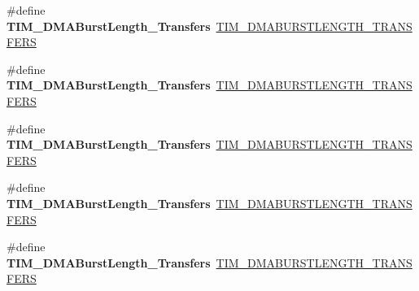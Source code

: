 \begin{DoxyCompactItemize}
\item 
\mbox{\label{group___h_a_l___t_i_m___aliased___defines_ga2fc09f2148cf6ebddc8e67116212259c}} 
\#define {\bfseries T\+I\+M\+\_\+\+D\+M\+A\+Burst\+Length\+\_\+Transfers}~\hyperlink{group___t_i_m___d_m_a___burst___length_ga793a89bb8a0669e274de451985186c53}{T\+I\+M\+\_\+\+D\+M\+A\+B\+U\+R\+S\+T\+L\+E\+N\+G\+T\+H\+\_\+T\+R\+A\+N\+S\+F\+E\+RS}
\item 
\mbox{\label{group___h_a_l___t_i_m___aliased___defines_ga0ca63a3caeaf1e85bd54961891949de7}} 
\#define {\bfseries T\+I\+M\+\_\+\+D\+M\+A\+Burst\+Length\+\_\+Transfers}~\hyperlink{group___t_i_m___d_m_a___burst___length_ga79ab58b6a3b30c54c0758b381df22cb0}{T\+I\+M\+\_\+\+D\+M\+A\+B\+U\+R\+S\+T\+L\+E\+N\+G\+T\+H\+\_\+T\+R\+A\+N\+S\+F\+E\+RS}
\item 
\mbox{\label{group___h_a_l___t_i_m___aliased___defines_ga9160d52913bbd7ad1e663ff943d01852}} 
\#define {\bfseries T\+I\+M\+\_\+\+D\+M\+A\+Burst\+Length\+\_\+Transfers}~\hyperlink{group___t_i_m___d_m_a___burst___length_gaf52962b501b3a76d89df6274ed425947}{T\+I\+M\+\_\+\+D\+M\+A\+B\+U\+R\+S\+T\+L\+E\+N\+G\+T\+H\+\_\+T\+R\+A\+N\+S\+F\+E\+RS}
\item 
\mbox{\label{group___h_a_l___t_i_m___aliased___defines_ga11485e9eee8a6a7edc1df868755eab85}} 
\#define {\bfseries T\+I\+M\+\_\+\+D\+M\+A\+Burst\+Length\+\_\+Transfers}~\hyperlink{group___t_i_m___d_m_a___burst___length_ga06a81eba628bea6495d86ebcc6021da0}{T\+I\+M\+\_\+\+D\+M\+A\+B\+U\+R\+S\+T\+L\+E\+N\+G\+T\+H\+\_\+T\+R\+A\+N\+S\+F\+E\+RS}
\item 
\mbox{\label{group___h_a_l___t_i_m___aliased___defines_gab1a097ca7404e518839df99795443fb0}} 
\#define {\bfseries T\+I\+M\+\_\+\+D\+M\+A\+Burst\+Length\+\_\+Transfers}~\hyperlink{group___t_i_m___d_m_a___burst___length_ga5f430b76c0aeded0a8d8be779f26ae52}{T\+I\+M\+\_\+\+D\+M\+A\+B\+U\+R\+S\+T\+L\+E\+N\+G\+T\+H\+\_\+T\+R\+A\+N\+S\+F\+E\+RS}
\item 
\mbox{\label{group___h_a_l___t_i_m___aliased___defines_gad13373f5fd246557a4fc487dc43c37ec}} 

\end{DoxyCompactItemize}
